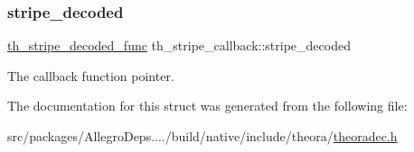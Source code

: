 \subsubsection{\texorpdfstring{stripe\+\_\+decoded}{stripe\_decoded}}
{\footnotesize\ttfamily \hyperlink{theoradec_8h_aac9c30f65672f8266d8370fc1ca55bca}{th\+\_\+stripe\+\_\+decoded\+\_\+func} th\+\_\+stripe\+\_\+callback\+::stripe\+\_\+decoded}

The callback function pointer. 

The documentation for this struct was generated from the following file\+:\begin{DoxyCompactItemize}
\item 
src/packages/\+Allegro\+Deps..../build/native/include/theora/\hyperlink{theoradec_8h}{theoradec.\+h}\end{DoxyCompactItemize}
